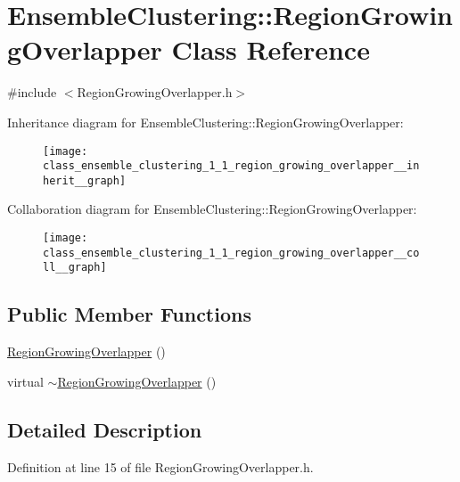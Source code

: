 \hypertarget{class_ensemble_clustering_1_1_region_growing_overlapper}{\section{Ensemble\-Clustering\-:\-:Region\-Growing\-Overlapper Class Reference}
\label{class_ensemble_clustering_1_1_region_growing_overlapper}
}


{\ttfamily \#include $<$Region\-Growing\-Overlapper.\-h$>$}



Inheritance diagram for Ensemble\-Clustering\-:\-:Region\-Growing\-Overlapper\-:\nopagebreak
\begin{figure}[H]
\begin{center}
\leavevmode
\texttt{[image: class\_ensemble\_clustering\_1\_1\_region\_growing\_overlapper\_\_inherit\_\_graph]}
\end{center}
\end{figure}


Collaboration diagram for Ensemble\-Clustering\-:\-:Region\-Growing\-Overlapper\-:\nopagebreak
\begin{figure}[H]
\begin{center}
\leavevmode
\texttt{[image: class\_ensemble\_clustering\_1\_1\_region\_growing\_overlapper\_\_coll\_\_graph]}
\end{center}
\end{figure}
\subsection*{Public Member Functions}
\begin{DoxyCompactItemize}
\item 
\hyperlink{class_ensemble_clustering_1_1_region_growing_overlapper_a35429f2952a64b9b53b8026557b54e30}{Region\-Growing\-Overlapper} ()
\item 
virtual \hyperlink{class_ensemble_clustering_1_1_region_growing_overlapper_a42a9074e3760f95fb325683adf6e5827}{$\sim$\-Region\-Growing\-Overlapper} ()
\end{DoxyCompactItemize}


\subsection{Detailed Description}


Definition at line 15 of file Region\-Growing\-Overlapper.\-h.



